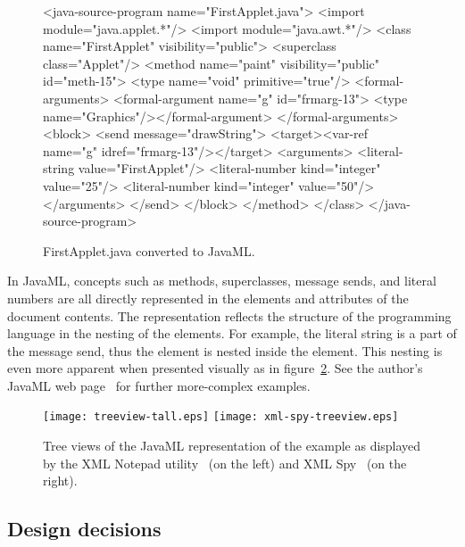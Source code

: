 \documentclass{article}
\begin{document}
\begin{multicols}{2}
\begin{figure}[p]
\begin{listing}{1}
<java-source-program name="FirstApplet.java">
  <import module="java.applet.*"/>
  <import module="java.awt.*"/>
  <class name="FirstApplet" visibility="public">
    <superclass class="Applet"/>
    <method name="paint" visibility="public" id="meth-15">
      <type name="void" primitive="true"/>
      <formal-arguments>
         <formal-argument name="g" id="frmarg-13">
             <type name="Graphics"/></formal-argument>
      </formal-arguments>
      <block>
        <send message="drawString">
          <target><var-ref name="g" idref="frmarg-13"/></target>
            <arguments>
              <literal-string value="FirstApplet"/>
              <literal-number kind="integer" value="25"/>
              <literal-number kind="integer" value="50"/>
            </arguments>
        </send>
      </block>
    </method>
  </class>
</java-source-program>
\end{listing}
\caption{FirstApplet.java converted to JavaML.
\label{fig-firstapplet-javaml}}
\end{figure}

In JavaML, concepts such as methods, superclasses, message
sends, and literal numbers are all directly represented in the elements
and attributes of the document contents.  The representation reflects the
structure of the programming language in the nesting of the elements.
For example, the literal string  is a part of the message
send, thus the  element is nested inside the
 element.  This nesting is even more apparent when
presented visually as in figure~\ref{fig-treeview}. See
 the author's JavaML web page~\cite{Badros-javaml}
for further more-complex examples.

\begin{figure}[p]
\begin{centering}
\texttt{[image: treeview-tall.eps]}
\hspace*{.5in}
\texttt{[image: xml-spy-treeview.eps]}
\caption{Tree views of the JavaML representation 
of the  example as displayed by the 
XML Notepad utility~\cite{XMLNotepad} (on the left) and XML Spy~\cite{XMLSpy} (on the 
right).
\label{fig-treeview}}
\end{centering}
\end{figure}

\subsection{Design decisions}
\label{ssec-design}


\end{multicols}
\end{document}
